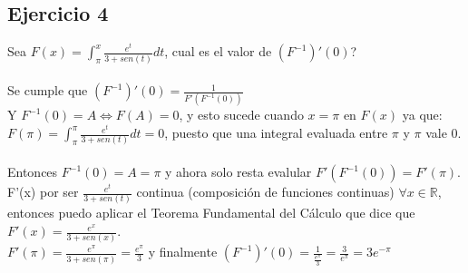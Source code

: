 \documentclass[a4paper,10pt]{article}
\newcommand{\dstr}[1]{\mathbb{#1}}
\newcommand{\RR}{\dstr{R}}
\begin{document}
\subsection*{Ejercicio 4}
Sea $\displaystyle F(x) = \int_{\pi}^{x} \frac{e^t}{3+sen(t)} dt$, cual es el valor de $(F^{-1})'(0)$?\\\\
Se cumple que $\displaystyle (F^{-1})'(0) = \frac{1}{F'(F^{-1}(0))}$\\
Y $F^{-1}(0) = A \Leftrightarrow F(A) = 0$, y esto sucede cuando $x = \pi$ en $F(x)$ ya que:\\
$\displaystyle F(\pi) = \int_{\pi}^{\pi} \frac{e^t}{3+sen(t)} dt = 0$, puesto que una integral evaluada entre $\pi$ y $\pi$ vale 0.\\\\
Entonces $F^{-1}(0) = A = \pi$  y ahora solo resta evalular $F'(F^{-1}(0)) = F'(\pi)$.\\
F'(x) por ser $\frac{e^t}{3+sen(t)}$ continua (composición de funciones continuas) $\forall x \in \RR$, entonces puedo aplicar el Teorema Fundamental del Cálculo que dice que $\displaystyle F'(x) = \frac{e^x}{3+sen(x)}$.\\
$\displaystyle F'(\pi) = \frac{e^\pi}{3+sen(\pi)} = \frac{e^\pi}{3}$ y finalmente $(F^{-1})'(0) = \displaystyle \frac{1}{ \frac{e^\pi}{3}} = \frac{3}{e^\pi} = 3 e^{-\pi}$
\end{document}
